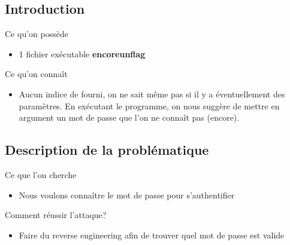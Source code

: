 \documentclass{beamer}
\begin{document}
	\subsection{Introduction}

	\begin{frame}

	\begin{block}{Ce qu'on possède}
		\begin{itemize}
			\item 1 fichier exécutable \textbf{encoreunflag}
		\end{itemize}
	\end{block}

	\begin{block}{Ce qu'on connaît}
	\begin{itemize}
		[circle]
		\item Aucun indice de fourni, on ne sait même pas si il y a éventuellement des paramètres. En exécutant le programme, on nous suggère de mettre en argument un mot de passe que l'on ne connaît pas (encore).
	\end{itemize}
	\end{block}

	\end{frame}

	\subsection{Description de la problématique}

	\begin{frame}
	\begin{block}{Ce que l'on cherche}
		\begin{itemize}
			\item Nous voulons connaître le mot de passe pour s'authentifier
		\end{itemize}
	\end{block}
	\begin{block}{Comment réussir l'attaque?}
		\begin{itemize}
			\item Faire du reverse engineering afin de trouver quel mot de passe est valide
		\end{itemize}
	\end{block}
	\end{frame}
\end{document}
